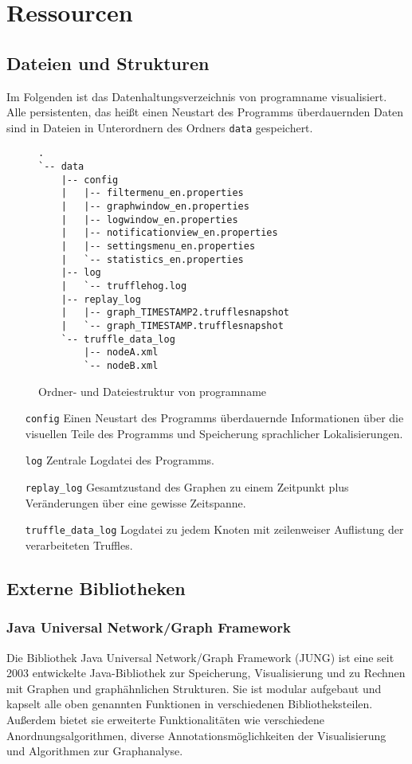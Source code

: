 \chapter{Ressourcen}
\section{Dateien und Strukturen}
Im Folgenden ist das Datenhaltungsverzeichnis von \gls{programname} visualisiert. Alle persistenten, das heißt einen Neustart des Programms überdauernden Daten sind in Dateien in Unterordnern des Ordners \texttt{data} gespeichert.  
\begin{figure}[htb]
  \centering
\begin{verbatim}
.
`-- data
    |-- config
    |   |-- filtermenu_en.properties
    |   |-- graphwindow_en.properties
    |   |-- logwindow_en.properties
    |   |-- notificationview_en.properties
    |   |-- settingsmenu_en.properties
    |   `-- statistics_en.properties
    |-- log
    |   `-- trufflehog.log
    |-- replay_log
    |   |-- graph_TIMESTAMP2.trufflesnapshot
    |   `-- graph_TIMESTAMP.trufflesnapshot
    `-- truffle_data_log
        |-- nodeA.xml
        `-- nodeB.xml
\end{verbatim}
  \caption[Ordner- und Dateiestruktur von \gls{programname}]{Ordner- und Dateiestruktur von \gls{programname}}
\end{figure}
\begin{itemize}
\item[\texttt{config}] Einen Neustart des Programms überdauernde Informationen über die visuellen Teile des Programms und Speicherung sprachlicher Lokalisierungen. 
\item[\texttt{log}] Zentrale Logdatei des Programms. 
\item[\texttt{replay\_log}] Gesamtzustand des Graphen zu einem Zeitpunkt plus Veränderungen über eine gewisse Zeitspanne. 
\item[\texttt{truffle\_data\_log}] Logdatei zu jedem Knoten mit zeilenweiser Auflistung der verarbeiteten Truffles.
\end{itemize}

\section{Externe Bibliotheken}
\subsection{Java Universal Network/Graph Framework}
Die Bibliothek Java Universal Network/Graph Framework (JUNG) ist eine seit 2003 entwickelte Java-Bibliothek zur Speicherung, Visualisierung und zu Rechnen mit Graphen und graphähnlichen Strukturen. Sie ist modular aufgebaut und kapselt alle oben genannten Funktionen in verschiedenen Bibliotheksteilen. Außerdem bietet sie erweiterte Funktionalitäten wie verschiedene Anordnungsalgorithmen, diverse Annotationsmöglichkeiten der Visualisierung und Algorithmen zur Graphanalyse. 

